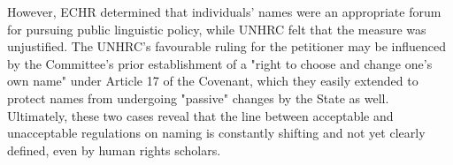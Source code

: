 However, ECHR determined that individuals' names were an appropriate forum for
pursuing public linguistic policy, while UNHRC felt that the measure was
unjustified. The UNHRC's favourable ruling for the petitioner may be influenced
by the Committee's prior establishment of a "right to choose and change one's
own name" under Article 17 of the Covenant, which they easily extended to
protect names from undergoing "passive" changes by the State as well.
Ultimately, these two cases reveal that the line between acceptable and
unacceptable regulations on naming is constantly shifting and not yet clearly
defined, even by human rights scholars.
